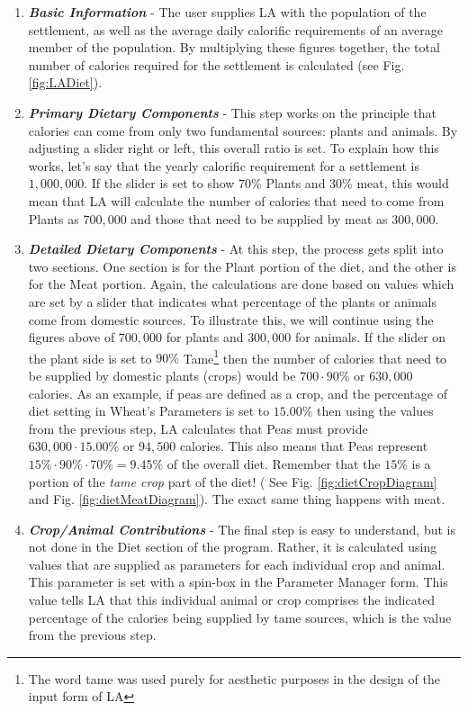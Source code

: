     \begin{enumerate}
      \item \textbf{\textit{Basic Information}} - The user supplies LA with the population of the settlement, as well as the average daily calorific requirements of an average member of the population.  By multiplying these figures together, the total number of calories required for the settlement is calculated (see Fig. \ref{fig:LADiet}).

      \item \textbf{\textit{Primary Dietary Components}} - This step works on the principle that calories can come from only two fundamental sources: plants and animals.  By adjusting a slider right or left, this overall ratio is set.  To explain how this works, let's say that the yearly calorific requirement for a settlement is $1,000,000$.  If the slider is set to show $70\%$ Plants and $30\%$ meat, this would mean that LA will calculate the number of calories that need to come from Plants as $700,000$ and those that need to be supplied by meat as $300,000$.

      \item \textbf{\textit{Detailed Dietary Components}} - At this step, the process gets split into two sections.  One section is for the Plant portion of the diet, and the other is for the Meat portion.  Again, the calculations are done based on values which are set by a slider that indicates what percentage of the plants or animals come from domestic sources.  To illustrate this, we will continue using the figures above of $700,000$ for plants and $300,000$ for animals.  If the slider on the plant side is set to $90\%$ Tame\footnote{The word tame was used purely for aesthetic purposes in the design of the input form of LA} then the number of calories that need to be supplied by domestic plants (crops) would be $700 \cdot 90\%$ or $630,000$ calories.  As an example, if peas are defined as a crop, and the percentage of diet setting in Wheat's Parameters is set to $15.00\%$ then using the values from the previous step, LA calculates that Peas must provide $630,000 \cdot 15.00\%$ or $94,500$ calories.  This also means that Peas represent $15\%\cdot90\%\cdot70\%=9.45\%$ of the overall diet.  Remember that the $15\%$ is a portion of the \textit{tame crop} part of the diet! ( See Fig. \ref{fig:dietCropDiagram} and Fig. \ref{fig:dietMeatDiagram}).  The exact same thing happens with meat.

      \item \textbf{\textit{Crop/Animal Contributions}} - The final step is easy to understand, but is not done in the Diet section of the program.  Rather, it is calculated using values that are supplied as parameters for each individual crop and animal.  This parameter is set with a spin-box in the Parameter Manager form.  This value tells LA that this individual animal or crop comprises the indicated percentage of the calories being supplied by tame sources, which is the value from the previous step.
    \end{enumerate}

